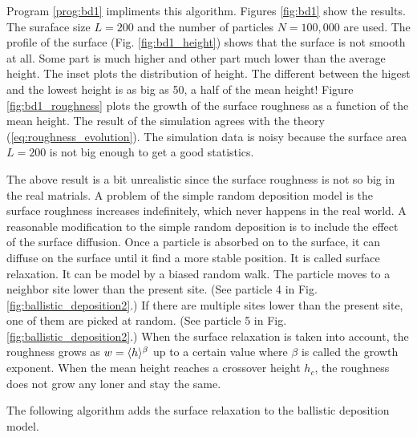 \bigskip
Program \ref{prog:bd1} impliments this algorithm.
Figures \ref{fig:bd1} show the results.  The suraface size $L=200$ and the number of particles $N=100,000$ are used. 
The profile of the surface (Fig. \ref{fig:bd1_height}) shows that the surface is not smooth at all.  Some part is much higher and other part much lower than the average height.  The inset plots the distribution of height. The different between the higest and the lowest height is as big as 50, a half of the mean height!  Figure \ref{fig:bd1_roughness} plots the growth of the surface roughness as a function of the mean height.  The result of the simulation agrees with the theory (\ref{eq:roughness_evolution}).  The simulation data is noisy because the surface area $L=200$ is not big enough to get a good statistics.

The above result is a bit unrealistic since the surface roughness is not so big in the real matrials.
A problem of the simple random deposition model is the surface roughness increases indefinitely, which  never happens in the real world.  A reasonable modification to the simple random deposition is to include the effect of the surface diffusion.\cite{surface_relaxation}  Once a particle is absorbed on to the surface, it can diffuse on the surface until it find a more stable position.  It is called surface relaxation.  It can be model by a biased random walk.  The particle moves to a neighbor site lower than the present site. (See particle 4 in Fig. \ref{fig:ballistic_deposition2}.)  If there are multiple sites lower than the present site, one of them are picked at random. (See particle 5 in Fig. \ref{fig:ballistic_deposition2}.)
When the surface relaxation is taken into account, the roughness grows as $w = \langle h \rangle^\beta$ up to a certain value where $\beta$ is called the growth exponent.  When the mean height reaches a crossover height $h_c$, the roughness does not grow any loner and stay the same.\cite{surface_relaxation}

The following algorithm adds the surface relaxation to the ballistic deposition model.

\bigskip

